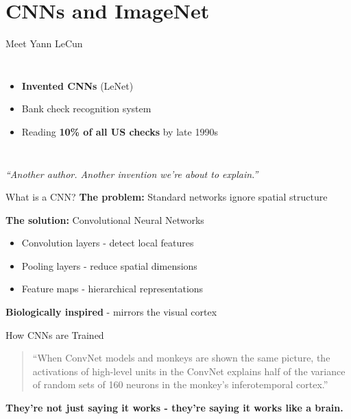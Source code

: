 \section{CNNs and ImageNet}

\begin{frame}{Meet Yann LeCun}
    \begin{columns}
        
        \begin{itemize}
            \item \textbf{Invented CNNs} (LeNet)
            \item Bank check recognition system
            \item Reading \textbf{10\% of all US checks} by late 1990s
        \end{itemize}
    \end{columns}
    
    \vspace{1em}
    \textit{``Another author. Another invention we're about to explain.''}
\end{frame}

\begin{frame}{What is a CNN?}
    \textbf{The problem:} Standard networks ignore spatial structure
    
    \vspace{1em}
    \textbf{The solution:} Convolutional Neural Networks
    \begin{itemize}
        \item Convolution layers - detect local features
        \item Pooling layers - reduce spatial dimensions
        \item Feature maps - hierarchical representations
    \end{itemize}
    
    \vspace{1em}
    \textbf{Biologically inspired} - mirrors the visual cortex
    
\end{frame}

\begin{frame}{How CNNs are Trained}
    
    \begin{quote}
        ``When ConvNet models and monkeys are shown the same picture, the activations of high-level units in the ConvNet explains half of the variance of random sets of 160 neurons in the monkey's inferotemporal cortex.''
    \end{quote}
    
    \vspace{1em}
    \textbf{They're not just saying it works - they're saying it works like a brain.}
\end{frame}

